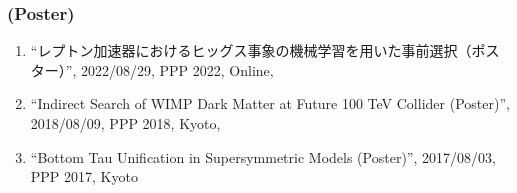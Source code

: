 \documentclass[12pt]{article}
\begin{document}
\subsubsection*{(Poster)}
\begin{enumerate}\item ``レプトン加速器におけるヒッグス事象の機械学習を用いた事前選択（ポスター）'', 2022/08/29, PPP 2022, Online,\item ``Indirect Search of WIMP Dark Matter at Future 100 TeV Collider (Poster)'', 2018/08/09, PPP 2018, Kyoto,\item ``Bottom Tau Unification in Supersymmetric Models (Poster)'', 2017/08/03, PPP 2017, Kyoto\end{enumerate}

\end{document}
